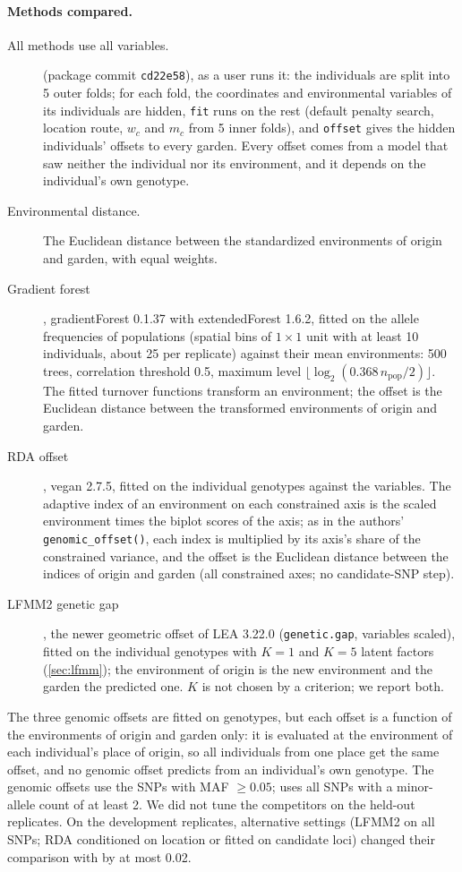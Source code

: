 \paragraph{Methods compared.} All methods use all variables.
\begin{description}
\item[\ecolocator] (package commit \texttt{cd22e58}), as a user runs it:
  the individuals are split into 5 outer folds; for each fold, the
  coordinates and environmental variables of its individuals are hidden,
  \texttt{fit} runs on the rest (default penalty search, location route,
  $w_c$ and $m_c$ from 5 inner folds), and \texttt{offset} gives the hidden
  individuals' offsets to every garden. Every offset comes from a model
  that saw neither the individual nor its environment, and it depends on
  the individual's own genotype.
\item[Environmental distance.] The Euclidean distance between the
  standardized environments of origin and garden, with equal weights.
\item[Gradient forest] \citep{ellis_gradient_2012,fitzpatrick_gradient_2015},
  gradientForest 0.1.37 with extendedForest 1.6.2, fitted on the allele
  frequencies of populations (spatial bins of $1\times1$ unit with at least
  10 individuals, about 25 per replicate) against their mean environments:
  500 trees, correlation threshold 0.5, maximum level
  $\lfloor \log_2(0.368\, n_\text{pop}/2) \rfloor$. The fitted turnover
  functions transform an environment; the offset is the Euclidean distance
  between the transformed environments of origin and garden.
\item[RDA offset] \citep{capblancq_rda_2021}, vegan 2.7.5, fitted on the
  individual genotypes against the variables. The adaptive index of an
  environment on each constrained axis is the scaled environment times the
  biplot scores of the axis; as in the authors' \texttt{genomic\_offset()},
  each index is multiplied by its axis's share of the constrained variance,
  and the offset is the Euclidean distance between the indices of origin
  and garden (all constrained axes; no candidate-SNP step).
\item[LFMM2 genetic gap] \citep{gain_genomic_2023}, the newer geometric
  offset of LEA 3.22.0 (\texttt{genetic.gap}, variables scaled), fitted on
  the individual genotypes with $K=1$ and $K=5$ latent factors
  (\cref{sec:lfmm}); the environment of origin is the new environment and
  the garden the predicted one. $K$ is not chosen by a criterion; we
  report both.
\end{description}
\noindent The three genomic offsets are fitted on genotypes, but each
offset is a function of the environments of origin and garden only: it is
evaluated at the environment of each individual's place of origin, so all
individuals from one place get the same offset, and no genomic offset
predicts from an individual's own genotype. The genomic offsets use the
SNPs with MAF $\geq 0.05$; \ecolocator uses all SNPs with a minor-allele
count of at least 2. We did not tune the competitors on the held-out
replicates. On the development replicates, alternative settings (LFMM2 on
all SNPs; RDA conditioned on location or fitted on candidate loci) changed
their comparison with \ecolocator by at most 0.02.

